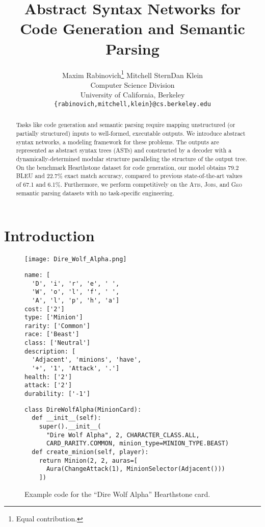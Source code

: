 \documentclass[11pt,a4paper]{article}
\title{Abstract Syntax Networks for Code Generation and Semantic Parsing}
\author{
  Maxim Rabinovich\thanks{\enskip Equal contribution.} \qquad Mitchell Stern\footnotemark[1] \qquad Dan Klein \\
  Computer Science Division \\
  University of California, Berkeley \\
  {\tt \{rabinovich,mitchell,klein\}@cs.berkeley.edu}
}
\date{}
\newcommand{\Geo}{\textsc{Geo}\xspace}
\newcommand{\Jobs}{\textsc{Jobs}\xspace}
\newcommand{\Atis}{\textsc{Atis}\xspace}
\newcommand{\HS}{{\sc Hearthstone}\xspace}
\begin{document}
\maketitle

\begin{abstract}

Tasks like code generation and semantic parsing require mapping unstructured (or partially structured) inputs to well-formed, executable outputs. We introduce abstract syntax networks, a modeling framework for these problems. The outputs are represented as abstract syntax trees (ASTs) and constructed by a decoder with a dynamically-determined modular structure paralleling the structure of the output tree. On the benchmark \HS dataset for code generation, our model obtains 79.2 BLEU and 22.7\% exact match accuracy, compared to previous state-of-the-art values of 67.1 and 6.1\%. Furthermore,
we perform competitively on the \Atis, \Jobs, and \Geo semantic parsing datasets with no task-specific engineering. 


\end{abstract}

\section{Introduction}

\begin{figure}[t]
\begin{minipage}[contentpos=t]{0.5\linewidth}
\texttt{[image: Dire\_Wolf\_Alpha.png]}
\end{minipage}\begin{minipage}[contentpos=t]{0.5\linewidth}
\begin{verbatim}
name: [
  'D', 'i', 'r', 'e', ' ', 
  'W', 'o', 'l', 'f', ' ', 
  'A', 'l', 'p', 'h', 'a']
cost: ['2']
type: ['Minion']
rarity: ['Common']
race: ['Beast']
class: ['Neutral']
description: [
  'Adjacent', 'minions', 'have',
  '+', '1', 'Attack', '.']
health: ['2']
attack: ['2']
durability: ['-1']
\end{verbatim}
\end{minipage}
\begin{verbatim}
class DireWolfAlpha(MinionCard):
  def __init__(self):
    super().__init__(
      "Dire Wolf Alpha", 2, CHARACTER_CLASS.ALL, 
      CARD_RARITY.COMMON, minion_type=MINION_TYPE.BEAST)
  def create_minion(self, player):
    return Minion(2, 2, auras=[
      Aura(ChangeAttack(1), MinionSelector(Adjacent()))
    ])
\end{verbatim}
\caption{Example code for the ``Dire Wolf Alpha'' Hearthstone card.\label{fig:card-example}}
\end{figure}
\end{document}
